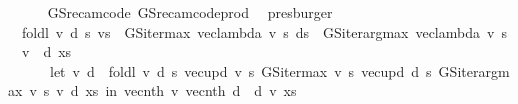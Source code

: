 \begin{isabellebody}
\ \ \ \ \isamarkupfalse%
\ GS{\isacharunderscore}{\kern0pt}rec{\isacharunderscore}{\kern0pt}am{\isacharunderscore}{\kern0pt}code{\isacharprime}{\kern0pt}\ GS{\isacharunderscore}{\kern0pt}rec{\isacharunderscore}{\kern0pt}am{\isacharunderscore}{\kern0pt}code{\isacharprime}{\kern0pt}{\isacharunderscore}{\kern0pt}prod\ \isamarkupfalse%
\ presburger\isanewline
\ \ \isamarkupfalse%
\ {}{\isacharcolon}{\kern0pt}\ {\isachardoublequoteopen}foldl\ {\isacharparenleft}{\kern0pt}{\isasymlambda}{\isacharparenleft}{\kern0pt}v{\isacharcomma}{\kern0pt}\ d{\isacharparenright}{\kern0pt}\ s{\isachardot}{\kern0pt}\ {\isacharparenleft}{\kern0pt}v{\isacharparenleft}{\kern0pt}s\ {\isacharcolon}{\kern0pt}{\isacharequal}{\kern0pt}\ GS{\isacharunderscore}{\kern0pt}iter{\isacharunderscore}{\kern0pt}max\ {\isacharparenleft}{\kern0pt}vec{\isacharunderscore}{\kern0pt}lambda\ v{\isacharparenright}{\kern0pt}\ s{\isacharparenright}{\kern0pt}{\isacharcomma}{\kern0pt}\ d{\isacharparenleft}{\kern0pt}s\ {\isacharcolon}{\kern0pt}{\isacharequal}{\kern0pt}\ GS{\isacharunderscore}{\kern0pt}iter{\isacharunderscore}{\kern0pt}arg{\isacharunderscore}{\kern0pt}max\ {\isacharparenleft}{\kern0pt}vec{\isacharunderscore}{\kern0pt}lambda\ v{\isacharparenright}{\kern0pt}\ s{\isacharparenright}{\kern0pt}{\isacharparenright}{\kern0pt}{\isacharparenright}{\kern0pt}\ {\isacharparenleft}{\kern0pt}{\isacharparenleft}{\kern0pt}{\isachardollar}{\kern0pt}{\isacharparenright}{\kern0pt}\ v{\isacharcomma}{\kern0pt}\ {\isacharparenleft}{\kern0pt}{\isachardollar}{\kern0pt}{\isacharparenright}{\kern0pt}\ d{\isacharparenright}{\kern0pt}\ xs\ {\isacharequal}{\kern0pt}\ \isanewline
\ \ \ \ \ \ {\isacharparenleft}{\kern0pt}let\ {\isacharparenleft}{\kern0pt}v{\isacharprime}{\kern0pt}{\isacharcomma}{\kern0pt}\ d{\isacharprime}{\kern0pt}{\isacharparenright}{\kern0pt}\ {\isacharequal}{\kern0pt}\ foldl\ {\isacharparenleft}{\kern0pt}{\isasymlambda}{\isacharparenleft}{\kern0pt}v{\isacharcomma}{\kern0pt}\ d{\isacharparenright}{\kern0pt}\ s{\isachardot}{\kern0pt}\ {\isacharparenleft}{\kern0pt}vec{\isacharunderscore}{\kern0pt}upd\ v\ s\ {\isacharparenleft}{\kern0pt}GS{\isacharunderscore}{\kern0pt}iter{\isacharunderscore}{\kern0pt}max\ v\ s{\isacharparenright}{\kern0pt}{\isacharcomma}{\kern0pt}\ vec{\isacharunderscore}{\kern0pt}upd\ d\ s\ {\isacharparenleft}{\kern0pt}GS{\isacharunderscore}{\kern0pt}iter{\isacharunderscore}{\kern0pt}arg{\isacharunderscore}{\kern0pt}max\ v\ s{\isacharparenright}{\kern0pt}{\isacharparenright}{\kern0pt}{\isacharparenright}{\kern0pt}\ {\isacharparenleft}{\kern0pt}v{\isacharcomma}{\kern0pt}\ d{\isacharparenright}{\kern0pt}\ xs\ in\ {\isacharparenleft}{\kern0pt}vec{\isacharunderscore}{\kern0pt}nth\ v{\isacharprime}{\kern0pt}{\isacharcomma}{\kern0pt}\ vec{\isacharunderscore}{\kern0pt}nth\ d{\isacharprime}{\kern0pt}{\isacharparenright}{\kern0pt}{\isacharparenright}{\kern0pt}{\isachardoublequoteclose}\ \ d\ v\ xs\isanewline

\end{isabellebody}
